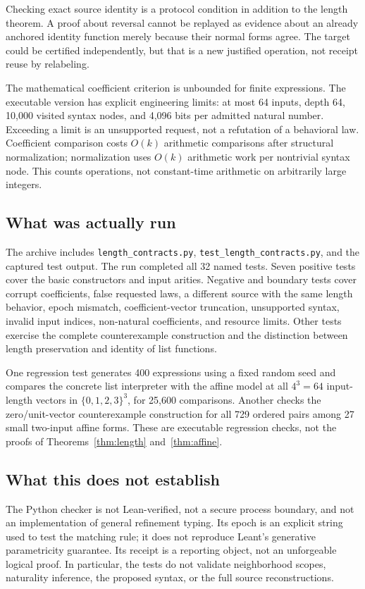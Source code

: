 \documentclass[11pt,letterpaper]{article}
\newcommand{\code}[1]{\nolinkurl{#1}}
\theoremstyle{definition}
\theoremstyle{remark}
\begin{document}
Checking exact source identity is a protocol condition in addition to the
length theorem. A proof about reversal cannot be replayed as evidence about an
already anchored identity function merely because their normal forms agree.
The target could be certified independently, but that is a new justified
operation, not receipt reuse by relabeling.

The mathematical coefficient criterion is unbounded for finite expressions. The
executable version has explicit engineering limits: at most 64 inputs, depth 64,
10,000 visited syntax nodes, and 4,096 bits per admitted natural number. Exceeding
a limit is an unsupported request, not a refutation of a behavioral law.
Coefficient comparison costs $O(k)$ arithmetic comparisons after structural
normalization; normalization uses $O(k)$ arithmetic work per nontrivial syntax
node. This counts operations, not constant-time arithmetic on arbitrarily large
integers.

\subsection{What was actually run}
The archive includes \code{length_contracts.py},
\code{test_length_contracts.py}, and the captured test output. The run completed
all 32 named tests. Seven positive tests cover the basic constructors and input
arities. Negative and boundary tests cover corrupt coefficients, false requested
laws, a different source with the same length behavior, epoch mismatch,
coefficient-vector truncation, unsupported syntax, invalid input indices,
non-natural coefficients, and resource limits. Other tests exercise the complete
counterexample construction and the distinction between length preservation and
identity of list functions.

One regression test generates 400 expressions using a fixed random seed and
compares the concrete list interpreter with the affine model at all $4^3=64$
input-length vectors in $\{0,1,2,3\}^3$, for 25,600 comparisons. Another checks
the zero/unit-vector counterexample construction for all 729 ordered pairs among
27 small two-input affine forms. These are executable regression checks, not the
proofs of Theorems~\ref{thm:length} and~\ref{thm:affine}.

\subsection{What this does not establish}
The Python checker is not Lean-verified, not a secure process boundary, and not
an implementation of general refinement typing. Its epoch is an explicit string
used to test the matching rule; it does not reproduce Leant's generative
parametricity guarantee. Its receipt is a reporting object, not an unforgeable
logical proof. In particular, the tests do not validate neighborhood scopes,
naturality inference, the proposed syntax, or the full source reconstructions.
\end{document}
